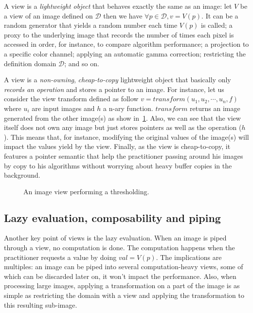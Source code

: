 A view is a \emph{lightweight object} that behaves exactly the same as an image: let $V$ be a view of an image defined
on $\mathcal{D}$ then we have $\forall{p}\in\mathcal{D}, v = V(p)$. It can be a random generator that yields a random
number each time $V(p)$ is called; a proxy to the underlying image that records the number of times each pixel is
accessed in order, for instance, to compare algorithm performance; a projection to a specific color channel; applying an
automatic gamma correction; restricting the definition domain $\mathcal{D}$; and so on.

A view is a \emph{non-owning}, \emph{cheap-to-copy} lightweight object that basically only \emph{records an
  operation} and stores a pointer to an image. For instance, let us consider the view transform defined as follow $v =
  transform(u_1, u_2, \cdots, u_n, f)$ where $u_i$ are input images and $h$ a n-ary function. $transform$ returns an image
generated from the other image(s) as show in~\cref{fig.view.threshold}. Also, we can see that the view itself does not
own any image but just stores pointers as well as the operation ($h$). This means that, for instance, modifying the
original values of the image(s) will impact the values yield by the view. Finally, as the view is cheap-to-copy, it
features a pointer semantic that help the practitioner passing around his images by copy to his algorithms without
worrying about heavy buffer copies in the background.

\begin{figure}[tbh]
  \centering
  \begin{minipage}{\linewidth}
    
  \end{minipage}
  \caption{An image view performing a thresholding.}
  \label{fig.view.threshold}
\end{figure}

\subsection{Lazy evaluation, composability and piping}

Another key point of views is the lazy evaluation. When an image is piped through a view, no computation is done. The
computation happens when the practitioner requests a value by doing $val = V(p)$. The implications are multiples: an
image can be piped into several computation-heavy views, some of which can be discarded later on, it won't impact the
performance. Also, when processing large images, applying a transformation on a part of the image is as simple as
restricting the domain with a view and applying the transformation to this resulting sub-image.

